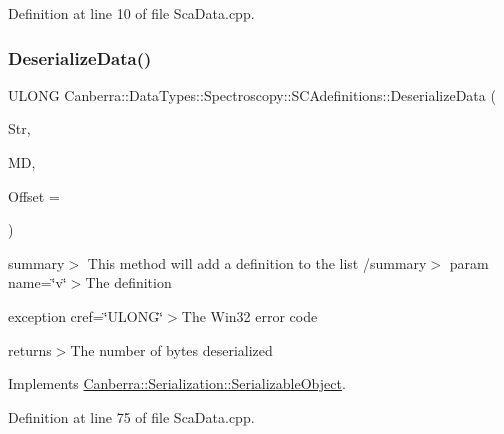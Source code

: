 Definition at line 10 of file Sca\+Data.\+cpp.

\mbox{\label{class_canberra_1_1_data_types_1_1_spectroscopy_1_1_s_c_adefinitions_af88eb264ae9d582a9e9fc77d91938308_af88eb264ae9d582a9e9fc77d91938308}} 
\subsubsection{\texorpdfstring{Deserialize\+Data()}{DeserializeData()}}
{\footnotesize\ttfamily U\+L\+O\+NG Canberra\+::\+Data\+Types\+::\+Spectroscopy\+::\+S\+C\+Adefinitions\+::\+Deserialize\+Data (\begin{DoxyParamCaption}\item[{\hyperlink{class_canberra_1_1_utility_1_1_core_1_1_byte_stream}{Canberra\+::\+Utility\+::\+Core\+::\+Byte\+Stream} \&}]{Str,  }\item[{const \hyperlink{class_canberra_1_1_serialization_1_1_meta_data}{Canberra\+::\+Serialization\+::\+Meta\+Data} \&}]{MD,  }\item[{const L\+O\+NG}]{Offset = {} }\end{DoxyParamCaption})\hspace{0.3cm}{\ttfamily [virtual]}}

summary$>$ This method will add a definition to the list /summary$>$ param name=\char`\"{}v\char`\"{}$>$The definition

exception cref=\char`\"{}\+U\+L\+O\+N\+G\char`\"{}$>$The Win32 error code

returns$>$The number of bytes deserialized

Implements \hyperlink{class_canberra_1_1_serialization_1_1_serializable_object}{Canberra\+::\+Serialization\+::\+Serializable\+Object}.



Definition at line 75 of file Sca\+Data.\+cpp.

\mbox{\label{class_canberra_1_1_data_types_1_1_spectroscopy_1_1_s_c_adefinitions_a2accbcce38d522bd52d87067cfaa184d_a2accbcce38d522bd52d87067cfaa184d}} 
